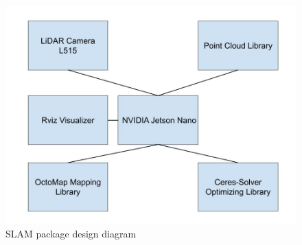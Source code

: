 \documentclass[a4paper, 10pt]{article}
\begin{document}
		\begin{figure} [!h]
			\centering
			\includegraphics[scale=0.35]{Photos/SLAM Package Design Diagram}
			\caption{SLAM package design diagram}
			\label{SLAM_nodes}
		\end{figure}
\end{document}
